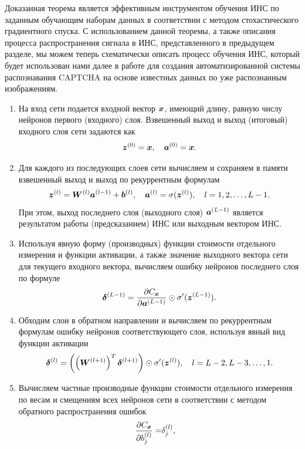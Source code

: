\documentclass[a4paper,12pt,russian]{article} %
\begin{document}
Доказанная теорема является эффективным инструментом обучения ИНС по заданным обучающим наборам данных в соответствии с методом стохастического градиентного спуска.
С использованием данной теоремы, а также описания процесса распространения сигнала в ИНС, представленного в предыдущем разделе, мы можем теперь схематически описать процесс обучения ИНС, который будет использован нами далее в работе для создания автоматизированной системы распознавания CAPTCHA на основе известных данных по уже распознанным изображениям.

\begin{enumerate}
	\item
		На вход сети подается входной вектор $\bm{x}$, имеющий длину, равную числу нейронов первого (входного) слоя.
		Взвешенный выход и выход (итоговый) входного слоя сети задаются как
		$$
			\bm{z}^{(0)} = \bm{x}, \quad
			\bm{a}^{(0)} = \bm{x}.
		$$
	\item
		Для каждого из последующих слоев сети вычисляем и сохраняем в памяти взвешенный выход и выход по рекуррентным формулам
		$$
			\bm{z}^{(l)} = \bm{W}^{(l)} \bm{a}^{(l-1)} + \bm{b}^{(l)}, \quad
			\bm{a}^{(l)} = \sigma (\bm{z}^{(l)}), \quad
			l = 1, 2, \ldots, L-1.
		$$
		При этом, выход последнего слоя (выходного слоя) $\bm{a}^{(L-1)}$ является результатом работы (предсказанием) ИНС или выходным вектором ИНС.
	\item
		Используя явную форму (производных) функции стоимости отдельного измерения и функции активации, а также значение выходного вектора сети для текущего входного вектора, вычисляем ошибку нейронов последнего слоя по формуле
		$$
			\bm{\delta}^{(L-1)} = \frac{\partial C_{\bm{x}}}{\partial \bm{a}^{(L-1)}} \odot \sigma'(\bm{z}^{(L-1)}).
		$$	
	\item
		Обходим слои в обратном направлении и вычисляем по рекуррентным формулам ошибку нейронов соответствующего слоя, используя явный вид функции активации
		$$
			\bm{\delta}^{(l)} = 
				\left( 
					\left( \bm{W}^{(l+1)} \right)^T \bm{\delta}^{(l+1)} 
				\right) 
				\odot \sigma'(\bm{z}^{(l)}),
			\quad
			l = L-2, L-3, \ldots, 1.
		$$
	\item
		Вычисляем частные производные функции стоимости отдельного измерения по весам и смещениям всех нейронов сети в соответствии с методом обратного распространения ошибок
		\begin{equation} \notag
			\begin{split}
				\frac{\partial C_{\vect{x}}}{\partial b_j^{(l)}} = & \delta_j^{(l)},

\end{split}
\end{equation}
\end{enumerate}
\end{document}
